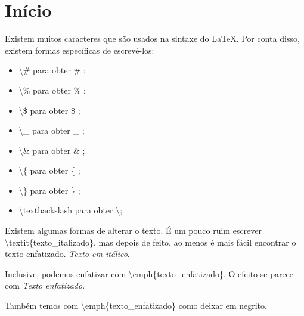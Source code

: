 \documentclass[a4paper, 12pt, oneside]{book}
\begin{document}


\chapter{Início}
Existem muitos caracteres que são usados na sintaxe do \LaTeX.
Por conta disso, existem formas específicas de escrevê-los:
\begin{itemize}
	\item \textbackslash \# para obter \# ;
	\item \textbackslash \% para obter \% ;
	\item \textbackslash \$ para obter \$ ;
	\item \textbackslash \_ para obter \_ ;
	\item \textbackslash \& para obter \& ;
	\item \textbackslash \{ para obter \{ ;
	\item \textbackslash \} para obter \} ;
	\item \textbackslash textbackslash para obter \textbackslash ;
\end{itemize}

Existem algumas formas de alterar o texto.
É um pouco ruim escrever \textbackslash textit\{texto_italizado\},
mas depois de feito, ao menos é mais fácil encontrar o texto enfatizado.
\textit{Texto em itálico}.

Inclusive, podemos enfatizar com \textbackslash emph\{texto_enfatizado\}.
O efeito se parece com \emph{Texto enfatizado}.

Também temos com \textbackslash emph\{texto_enfatizado\} como deixar em negrito.
\end{document}
